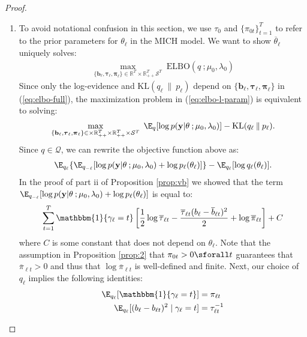 \begin{proof}
\begin{enumerate}[label=\roman*.]
\item To avoid notational confusion in this section, we use $\tau_0$ and $\{\pi_{0t}\}_{t=1}^T$ to refer to the prior parameters for $\theta_\ell$ in the MICH model. We want to show $\overline{\theta}_\ell$ uniquely solves: 
\begin{align}
    \max_{\{\mathbf{b}_\ell, \boldsymbol{\tau}_\ell, \boldsymbol{\pi}_\ell\} \in \mathbb{R}^T\times\mathbb{R}_{++}^T\mathcal{S}^T} \;  \text{ELBO}(q\:;\mu_0,\lambda_0) \label{eq:elbo-l-param}
\end{align}
Since only the log-evidence and $\text{KL}(q_\ell\:\lVert\: p_\ell)$ depend on $\{\mathbf{b}_\ell, \boldsymbol{\tau}_\ell, \boldsymbol{\pi}_\ell\}$ in (\ref{eq:elbo-full}), the maximization problem in (\ref{eq:elbo-l-param}) is equivalent to solving: 
\begin{align*}
    \max_{\{\mathbf{b}_\ell, \boldsymbol{\tau}_\ell, \boldsymbol{\pi}_\ell\} \in \times\mathbb{R}_{++}^T\times\mathbb{R}_{++}^T \times\mathcal{S}^T} \;  \E_q[\log p(\mathbf{y}| \theta\:; \mu_0,\lambda_0)] - \text{KL}(q_\ell\:\lVert\: p_\ell).
\end{align*}
Since $q \in \mathcal{Q}$, we can rewrite the objective function above as:
\begin{align*}
    \E_{q_\ell}\{\E_{q_{-\ell}}[\log p(\mathbf{y}| \theta\:; \mu_0,\lambda_0)+\log p_\ell(\theta_\ell)]\} - \E_{q_\ell}[\log q_\ell(\theta_\ell)].
\end{align*}
In the proof of part ii of Proposition \ref{prop:vb} we showed that the term $\E_{q_{-\ell}}[\log p(\mathbf{y}| \theta\:; \mu_0,\lambda_0)+\log p_\ell(\theta_\ell)]$ is equal to:
\begin{align*}
     \sum_{t=1}^T \mathbbm{1}\{\gamma_\ell = t\}\left[\frac{1}{2} \log \overline{\tau}_{\ell t} - \frac{\overline{\tau}_{\ell t}(b_{\ell } - \overline{b}_{\ell t})^2}{2} + \log \overline{\pi}_{\ell t}\right] + C
\end{align*}
where $C$ is some constant that does not depend on $\theta_\ell$. Note that the assumption in Proposition \ref{prop:2} that $\pi_{0t} > 0 \sforall t$ guarantees that $\overline{\pi}_{\ell t} > 0$ and thus that $\log \overline{\pi}_{\ell t}$ is well-defined and finite. Next, our choice of $q_\ell$ implies the following identities:
\begin{align*}
    \E_{q_\ell}[\mathbbm{1}\{\gamma_\ell = t\}] &= \pi_{\ell t} \\
    \E_{q_\ell}[(b_\ell - b_{\ell t})^2\;|\;\gamma_\ell=t] &= \tau_{\ell t}^{-1}\\

\end{align*}
\end{enumerate}
\end{proof}
